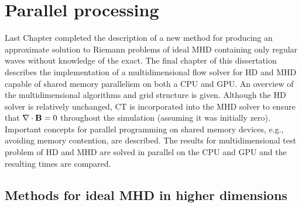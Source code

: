 %
%


\chapter[Parallel processing]{Parallel processing}
\label{chp:gpu}

Last Chapter completed the description of a new method for producing an approximate solution to Riemann problems of ideal MHD containing only regular waves without knowledge of the exact.  The final chapter of this dissertation describes the implementation of a multidimensional flow solver for HD and MHD capable of shared memory parallelism on both a CPU and GPU.  An overview of the multidimensional algorithms and grid structure is given.  Although the HD solver is relatively unchanged, CT \citep{Evans:1988} is incorporated into the MHD solver to ensure that $\mathbf{\nabla} \cdot \mathbf{B} = 0$ throughout the simulation (assuming it was initially zero).  Important concepts for parallel programming on shared memory devices, e.g., avoiding memory contention, are described.   The results for multidimensional test problem of HD and MHD are solved in parallel on the CPU and GPU and the resulting times are compared.

\section[Methods for ideal MHD in higher dimensions]{Methods for ideal MHD in higher dimensions}          
\label{sec:2d_mhd}

